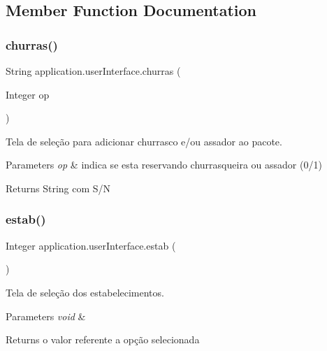 \subsection{Member Function Documentation}
\mbox{\label{classapplication_1_1user_interface_acd3a41cd8b5810b742d9e82ed21c9e86}} 
\subsubsection{\texorpdfstring{churras()}{churras()}}
{\footnotesize\ttfamily String application.\+user\+Interface.\+churras (\begin{DoxyParamCaption}\item[{Integer}]{op }\end{DoxyParamCaption})}



Tela de seleção para adicionar churrasco e/ou assador ao pacote. 


\begin{DoxyParams}{Parameters}
{\em op} & indica se esta reservando churrasqueira ou assador (0/1) \\
\hline
\end{DoxyParams}
\begin{DoxyReturn}{Returns}
String com S/N 
\end{DoxyReturn}
\mbox{\label{classapplication_1_1user_interface_a74b097135baddace392249524e2f859a}} 
\subsubsection{\texorpdfstring{estab()}{estab()}}
{\footnotesize\ttfamily Integer application.\+user\+Interface.\+estab (\begin{DoxyParamCaption}{ }\end{DoxyParamCaption})}



Tela de seleção dos estabelecimentos. 


\begin{DoxyParams}{Parameters}
{\em void} & \\
\hline
\end{DoxyParams}
\begin{DoxyReturn}{Returns}
o valor referente a opção selecionada 
\end{DoxyReturn}
\mbox{\label{classapplication_1_1user_interface_a52fe91e8ac2b04a9ca5e8194f83b2b26}} 
